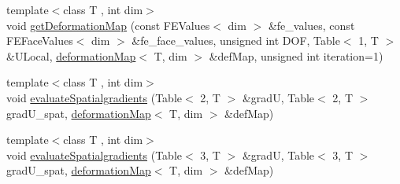 \begin{DoxyCompactItemize}
\item 
{\footnotesize template$<$class T , int dim$>$ }\\void \hyperlink{group___evaluation_functions_ga239b206235603af9482484c29c8d57ea}{get\-Deformation\-Map} (const F\-E\-Values$<$ dim $>$ \&fe\-\_\-values, const F\-E\-Face\-Values$<$ dim $>$ \&fe\-\_\-face\-\_\-values, unsigned int D\-O\-F, Table$<$ 1, T $>$ \&U\-Local, \hyperlink{structdeformation_map}{deformation\-Map}$<$ T, dim $>$ \&def\-Map, unsigned int iteration=1)
\item 
{\footnotesize template$<$class T , int dim$>$ }\\void \hyperlink{group___evaluation_functions_gadb862d9530a60b8ce5255222778ceeb6}{evaluate\-Spatialgradients} (Table$<$ 2, T $>$ \&grad\-U, Table$<$ 2, T $>$ grad\-U\-\_\-spat, \hyperlink{structdeformation_map}{deformation\-Map}$<$ T, dim $>$ \&def\-Map)
\item 
{\footnotesize template$<$class T , int dim$>$ }\\void \hyperlink{group___evaluation_functions_ga0b976342d491f6215953e2e65ea6a0de}{evaluate\-Spatialgradients} (Table$<$ 3, T $>$ \&grad\-U, Table$<$ 3, T $>$ grad\-U\-\_\-spat, \hyperlink{structdeformation_map}{deformation\-Map}$<$ T, dim $>$ \&def\-Map)
\end{DoxyCompactItemize}
